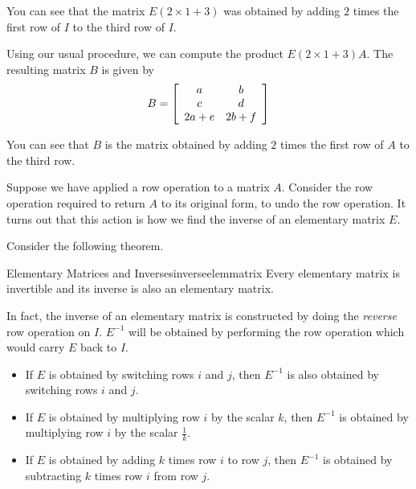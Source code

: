 \begin{solution}
You can see that the matrix $E\left( 2 \times 1+3\right)$ was obtained by adding $2$ times the first row
of $I$ to the third row of $I$. 

Using our usual procedure, we can compute the product $E\left( 2 \times 1+3\right)A$. The resulting 
matrix $B$ is given by 
\begin{equation*}
B = \left[
\begin{array}{cc}
a & b \\
c & d \\
2a+e & 2b+f
\end{array}
\right]
\end{equation*}

You can see that $B$ is the matrix obtained by adding $2$ times the first row of $A$ to the third row. 
\end{solution}

Suppose we have applied a row operation to a matrix $A$. Consider the row operation required to return $A$ to its original form, to undo
the row operation. It turns out that this action is how we find the inverse of an elementary matrix $E$. 

Consider the following theorem.

\begin{theorem}{Elementary Matrices and Inverses}{inverseelemmatrix}
Every elementary matrix is invertible and its inverse is also an elementary matrix.
\end{theorem}

In fact, the inverse of an elementary matrix is constructed by doing the {\em reverse \em}row operation on $I$. $E^{-1}$ will
be obtained by performing the row operation which would carry $E$ back to $I$. 

\begin{itemize}
\item If $E$ is obtained by switching rows $i$ and $j$, then $E^{-1}$ is also obtained by switching rows $i$ and $j$. 

\item If $E$ is obtained by multiplying row $i$ by the scalar $k$, then $E^{-1}$ is obtained by multiplying row $i$ by
the scalar $\frac{1}{k}$. 

\item If $E$ is obtained by adding $k$ times row $i$ to row $j$, then $E^{-1}$ is obtained by 
subtracting $k$ times row $i$ from row $j$.
\end{itemize} 

